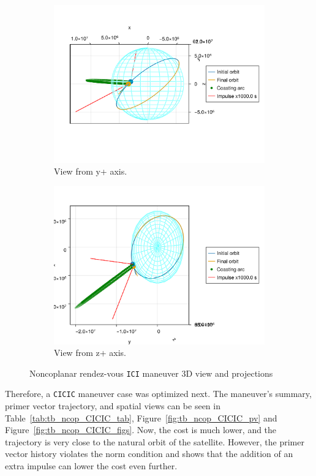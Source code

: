 \begin{figure}[htbp]
\begin{subfigure}{0.49\linewidth}
        \includegraphics[width=\linewidth]{../results/two_body/ipv_noncop/ICI_y+.png}
        \caption{View from y+ axis.}
    \end{subfigure}
    \begin{subfigure}{0.49\linewidth}
        \includegraphics[width=\linewidth]{../results/two_body/ipv_noncop/ICI_z+.png}
        \caption{View from z+ axis.}
    \end{subfigure}
    \caption{Noncoplanar rendez-vous \texttt{ICI} maneuver 3D view and projections}
    \label{fig:tb_ncop_ICI_figs}
\end{figure}

Therefore, a \texttt{CICIC} maneuver case was optimized next. The maneuver's summary, primer vector trajectory, and spatial views can be seen in Table~\ref{tab:tb_ncop_CICIC_tab}, Figure~\ref{fig:tb_ncop_CICIC_pv} and Figure~\ref{fig:tb_ncop_CICIC_figs}. Now, the cost is much lower, and the trajectory is very close to the natural orbit of the satellite. However, the primer vector history violates the norm condition and shows that the addition of an extra impulse can lower the cost even further. 

